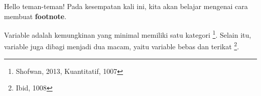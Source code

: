 \documentclass[12pt, times new roman]{article}
\begin{document}
Hello teman-teman! Pada kesempatan kali ini, kita akan belajar mengenai cara membuat \textbf{footnote}.

Variable adalah kemungkinan yang minimal memiliki satu kategori \footnote{Shofwan, 2013, Kuantitatif, 1007}. Selain itu, variable juga dibagi menjadi dua macam, yaitu variable bebas dan terikat \footnote{Ibid, 1008}.
\end{document}
